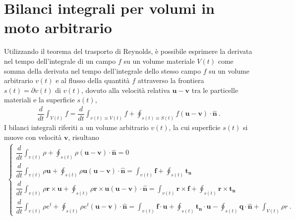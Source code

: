 \documentclass[letterpaper,10pt,italian]{jupyterBook}
\begin{document}
\section{Bilanci integrali per volumi in moto arbitrario}
\label{\detokenize{polimi/fluidmechanics-ita/template/capitoli/04_bilanci/04teoria:bilanci-integrali-per-volumi-in-moto-arbitrario}}
\sphinxAtStartPar
Utilizzando il teorema del trasporto di Reynolds, è possibile esprimere
la derivata nel tempo dell’integrale di un campo \(f\) su un volume
materiale \(V(t)\) come somma della derivata nel tempo dell’integrale
dello stesso campo \(f\) su un volume arbitrario \(v(t)\) e al flusso della
quantità \(f\) attraverso la frontiera \(s(t)=\partial v(t)\) di \(v(t)\),
dovuto alla velocità relativa \(\mathbf{u} - \mathbf{v}\) tra le particelle
materiali e la superficie \(s(t)\),
\begin{equation*}
\begin{split}\dfrac{d}{d t} \int_{V(t)} f = \dfrac{d}{d t} \int_{v(t)\equiv V(t)} f +
 \oint_{s(t)\equiv S(t)} f (\mathbf{u} - \mathbf{v}) \cdot \mathbf{\hat{n}} \ .\end{split}
\end{equation*}
\sphinxAtStartPar
I bilanci integrali riferiti a un volume arbitrario \(v(t)\), la cui
superficie \(s(t)\) si muove con velocità \(\mathbf{v}\), risultano
\begin{equation*}
\begin{split}\begin{cases}
 \dfrac{d}{dt} \displaystyle\int_{v(t)} \rho + \oint_{s(t)} \rho (\mathbf{u}-\mathbf{v}) \cdot \mathbf{\hat{n}}= 0  \\
 \dfrac{d}{dt} \displaystyle\int_{v(t)} \rho \mathbf{u} + \oint_{s(t)} \rho \mathbf{u} (\mathbf{u} - \mathbf{v}) \cdot \mathbf{\hat{n}} = \int_{v(t)} \mathbf{f} + \oint_{s(t)} \mathbf{t_n}  \\
 \dfrac{d}{dt} \displaystyle\int_{v(t)} \rho \mathbf{r} \times \mathbf{u} + \oint_{s(t)} \rho \mathbf{r} \times \mathbf{u} (\mathbf{u}-\mathbf{v}) \cdot \mathbf{\hat{n}}= \int_{v(t)} \mathbf{r} \times \mathbf{f} + \oint_{s(t)} \mathbf{r} \times \mathbf{t_n} \\
 \dfrac{d}{dt} \displaystyle\int_{v(t)} \rho e^t + \oint_{s(t)} \rho e^t (\mathbf{u}-\mathbf{v}) \cdot \mathbf{\hat{n}}= \int_{v(t)} \mathbf{f} \cdot \mathbf{u} + \oint_{s(t)} \mathbf{t_n} \cdot \mathbf{u} - \oint_{s(t)} \mathbf{q} \cdot \mathbf{\hat{n}} + \int_{V(t)} \rho r \ .
\end{cases}\end{split}
\end{equation*}
\end{document}

